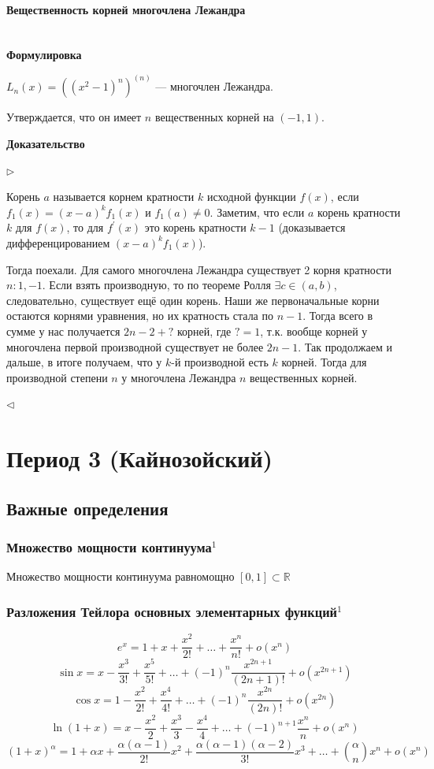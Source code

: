 \documentclass{article}
\let\vanillaparagraph\paragraph
\renewcommand{\paragraph}[1]{\vanillaparagraph{#1}\mbox{}\\}
\begin{document}
\paragraph{Вещественность корней многочлена Лежандра}
\textbf{Формулировка}

$L_n(x) = \left((x^2-1)^n\right)^{(n)}$ --- многочлен Лежандра.

Утверждается, что он имеет $n$ вещественных корней на $(-1, 1)$.

\textbf{Доказательство}

$\rhd$

Корень $a$ называется корнем кратности $k$ исходной функции $f(x)$, если $f_1(x) = (x - a)^kf_1(x)$ и $f_1(a) \neq 0$. Заметим, что если $a$ корень кратности $k$ для $f(x)$, то для $f^\prime(x)$ это корень кратности $k - 1$ (доказывается дифференцированием $(x - a)^kf_1(x)$).

Тогда поехали. Для самого многочлена Лежандра существует 2 корня кратности $n: {1, -1}$. Если взять производную, то по теореме Ролля $\exists c \in (a, b)$, следовательно, существует ещё один корень. Наши же первоначальные корни остаются корнями уравнения, но их кратность стала по $n-1$. Тогда всего в сумме у нас получается $2n - 2 + ?$ корней, где $? = 1$, т.к. вообще корней у многочлена первой производной существует не более $2n - 1$. Так продолжаем и дальше, в итоге получаем, что у $k$-й производной есть $k$ корней. Тогда для производной степени $n$ у многочлена Лежандра $n$ вещественных корней.

$\lhd$

\newpage



\section{Период 3 (Кайнозойский)}
\subsection{Важные определения}

\subsubsection{Множество мощности континуума\texorpdfstring{$^1$}{}}
Множество мощности континуума равномощно $[0, 1] \subset \mathbb{R}$


\subsubsection{Разложения Тейлора основных элементарных функций\texorpdfstring{$^1$}{}}
$$
e^x = 1 + x + \frac{x^2}{2!}+\ldots+\frac{x^n}{n!}+o(x^n)
$$
$$
\sin{x} = x - \frac{x^3}{3!} + \frac{x^5}{5!} + \ldots + (-1)^n\frac{x^{2n+1}}{(2n+1)!} + o(x^{2n+1})
$$
$$
\cos{x} = 1 - \frac{x^2}{2!} + \frac{x^4}{4!} + \ldots + (-1)^n\frac{x^{2n}}{(2n)!} + o(x^{2n})
$$
$$
\ln{(1 + x)} = x - \frac{x^2}{2} + \frac{x^3}{3} - \frac{x^4}{4} + \ldots + (-1)^{n+1}\frac{x^n}{n} + o(x^n)
$$
$$
(1+x)^\alpha = 1 + \alpha x + \frac{\alpha (\alpha - 1)}{2!}x^2 + \frac{\alpha(\alpha-1)(\alpha-2)}{3!}x^3 + \ldots + \binom{\alpha}{n}x^n + o(x^n)
$$
\end{document}

